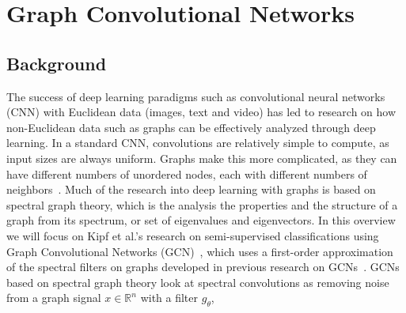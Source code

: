 
\section{Graph Convolutional Networks}

\subsection{Background}
The success of deep learning paradigms such as convolutional neural networks (CNN) with Euclidean data (images, text and video) has led to research on how non-Euclidean data such as graphs can be effectively analyzed through deep learning. In a standard CNN, convolutions are relatively simple to compute, as input sizes are always uniform. Graphs make this more complicated, as they can have different numbers of unordered nodes, each with different numbers of neighbors~\cite{Wu2019}. Much of the research into deep learning with graphs is based on spectral graph theory, which is the analysis the properties and the structure of a graph from its spectrum, or set of eigenvalues and eigenvectors. In this overview we will focus on Kipf et al.'s research on semi-supervised classifications using Graph Convolutional Networks (GCN)~\cite{Kipf2016}, which uses a first-order approximation of the spectral filters on graphs developed in previous research on GCNs~\cite{Bruna2013}. GCNs based on spectral graph theory look at spectral convolutions as removing noise from a graph signal $x \in \mathbb{R}^n$ with a filter $g_\theta$,

